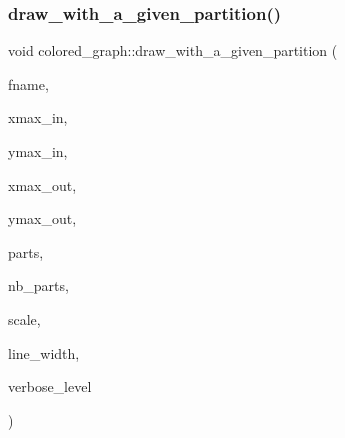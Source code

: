 \subsubsection{\texorpdfstring{draw\+\_\+with\+\_\+a\+\_\+given\+\_\+partition()}{draw\_with\_a\_given\_partition()}}
{\footnotesize\ttfamily void colored\+\_\+graph\+::draw\+\_\+with\+\_\+a\+\_\+given\+\_\+partition (\begin{DoxyParamCaption}\item[{const \mbox{\hyperlink{galois_8h_ab6cc7b4aeb6ea31aba2b3fbfc83ff5e6}{B\+Y\+TE}} $\ast$}]{fname,  }\item[{\mbox{\hyperlink{galois_8h_a09fddde158a3a20bd2dcadb609de11dc}{I\+NT}}}]{xmax\+\_\+in,  }\item[{\mbox{\hyperlink{galois_8h_a09fddde158a3a20bd2dcadb609de11dc}{I\+NT}}}]{ymax\+\_\+in,  }\item[{\mbox{\hyperlink{galois_8h_a09fddde158a3a20bd2dcadb609de11dc}{I\+NT}}}]{xmax\+\_\+out,  }\item[{\mbox{\hyperlink{galois_8h_a09fddde158a3a20bd2dcadb609de11dc}{I\+NT}}}]{ymax\+\_\+out,  }\item[{\mbox{\hyperlink{galois_8h_a09fddde158a3a20bd2dcadb609de11dc}{I\+NT}} $\ast$}]{parts,  }\item[{\mbox{\hyperlink{galois_8h_a09fddde158a3a20bd2dcadb609de11dc}{I\+NT}}}]{nb\+\_\+parts,  }\item[{double}]{scale,  }\item[{double}]{line\+\_\+width,  }\item[{\mbox{\hyperlink{galois_8h_a09fddde158a3a20bd2dcadb609de11dc}{I\+NT}}}]{verbose\+\_\+level }\end{DoxyParamCaption})}

\mbox{\label{classcolored__graph_a1b241a243ef5c2d39d910403d28a083c}} 

